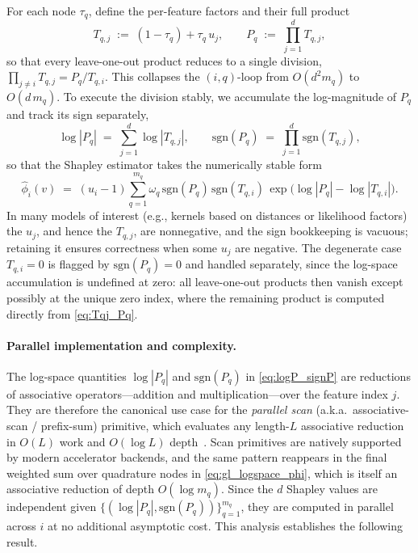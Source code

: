 \documentclass{article}
\begin{document}
For each node $\tau_q$, define the per-feature factors and their full product
\begin{equation}
\label{eq:Tqj_Pq}
T_{q,j}\;:=\;(1-\tau_q)+\tau_q\,u_j, \qquad
P_q\;:=\;\prod_{j=1}^d T_{q,j},
\end{equation}
so that every leave-one-out product reduces to a single division, $\prod_{j\neq i} T_{q,j} = P_q / T_{q,i}$. This collapses the $(i,q)$-loop from $O(d^2 m_q)$ to $O(d\,m_q)$. To execute the division stably, we accumulate the log-magnitude of $P_q$ and track its sign separately,
\begin{equation}
\label{eq:logP_signP}
\log |P_q| \;=\; \sum_{j=1}^d \log |T_{q,j}|,
\qquad
\mathrm{sgn}(P_q) \;=\; \prod_{j=1}^d \mathrm{sgn}(T_{q,j}),
\end{equation}
so that the Shapley estimator takes the numerically stable form
\begin{equation}
\label{eq:gl_logspace_phi}
\widehat{\phi}_i(v)
\;=\;
(u_i-1)
\sum_{q=1}^{m_q} \omega_q\,
\mathrm{sgn}(P_q)\,\mathrm{sgn}(T_{q,i})\,
\exp\!\bigl(\log|P_q|-\log|T_{q,i}|\bigr).
\end{equation}
In many models of interest (e.g., kernels based on distances or likelihood factors) the $u_j$, and hence the $T_{q,j}$, are nonnegative, and the sign bookkeeping is vacuous; retaining it ensures correctness when some $u_j$ are negative. The degenerate case $T_{q,i}=0$ is flagged by $\mathrm{sgn}(P_q)=0$ and handled separately, since the log-space accumulation is undefined at zero: all leave-one-out products then vanish except possibly at the unique zero index, where the remaining product is computed directly from \cref{eq:Tqj_Pq}.


\paragraph{Parallel implementation and complexity.}
The log-space quantities $\log|P_q|$ and $\mathrm{sgn}(P_q)$ in \cref{eq:logP_signP} are reductions of associative operators---addition and multiplication---over the feature index $j$. They are therefore the canonical use case for the \emph{parallel scan} (a.k.a.\ associative-scan / prefix-sum) primitive, which evaluates any length-$L$ associative reduction in $O(L)$ work and $O(\log L)$ depth~\citep{blelloch1990prefix}. Scan primitives are natively supported by modern accelerator backends, and the same pattern reappears in the final weighted sum over quadrature nodes in \cref{eq:gl_logspace_phi}, which is itself an associative reduction of depth $O(\log m_q)$. Since the $d$ Shapley values are independent given $\{(\log|P_q|,\mathrm{sgn}(P_q))\}_{q=1}^{m_q}$, they are computed in parallel across $i$ at no additional asymptotic cost. This analysis establishes the following result.
\end{document}
